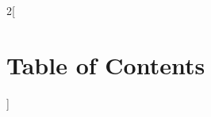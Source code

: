 \documentclass[
english,
]{article}
\begin{document}
\maketitle
\thispagestyle{fancy}

\begin{multicols*}{2}[
\section*{Table of Contents}
]
\tableofcontents
\end{multicols*}
\newpage


\newpage

\newpage

\newpage

\newpage

\newpage

\newpage

\newpage

\newpage

\newpage

\newpage

\newpage

\end{document}
